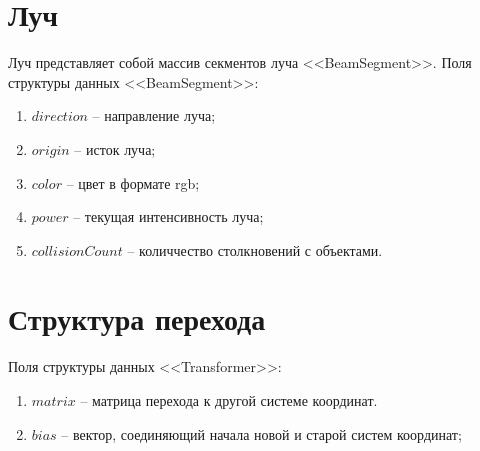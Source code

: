 {    \section{Луч} {
        Луч представляет собой массив секментов луча <<BeamSegment>>.
        Поля структуры данных <<BeamSegment>>:
        \begin{enumerate}
            \item $direction$ -- направление луча;
             \item $origin$ -- исток луча;
            \item $color$ -- цвет в формате rgb;
            \item $power$ -- текущая интенсивность луча;
            \item $collisionCount$ -- количчество столкновений с объектами.
        \end{enumerate}
    }
    \section {Структура перехода} {
        Поля структуры данных <<Transformer>>:
        \begin{enumerate}
            \item $matrix$ -- матрица перехода к другой системе координат.
            \item $bias$ -- вектор, соединяющий начала новой и старой систем координат;
        \end{enumerate}
    }
}
